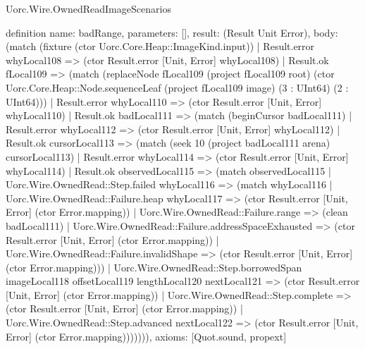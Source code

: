 \begin{lexlean}{Uorc.Wire.OwnedReadImageScenarios}
\begin{semanticmodule}
definition{
  name: badRange,
  parameters: [],
  result: (Result Unit Error),
  body: (match (fixture (ctor Uorc.Core.Heap::ImageKind.input))
    | Result.error whyLocal108 => (ctor Result.error [Unit, Error] whyLocal108)
    | Result.ok fLocal109 => (match (replaceNode fLocal109 (project fLocal109 root) (ctor Uorc.Core.Heap::Node.sequenceLeaf (project fLocal109 image) (3 : UInt64) (2 : UInt64)))
      | Result.error whyLocal110 => (ctor Result.error [Unit, Error] whyLocal110)
      | Result.ok badLocal111 => (match (beginCursor badLocal111)
        | Result.error whyLocal112 => (ctor Result.error [Unit, Error] whyLocal112)
        | Result.ok cursorLocal113 => (match (seek 10 (project badLocal111 arena) cursorLocal113)
          | Result.error whyLocal114 => (ctor Result.error [Unit, Error] whyLocal114)
          | Result.ok observedLocal115 => (match observedLocal115
            | Uorc.Wire.OwnedRead::Step.failed whyLocal116 => (match whyLocal116
              | Uorc.Wire.OwnedRead::Failure.heap whyLocal117 => (ctor Result.error [Unit, Error] (ctor Error.mapping))
              | Uorc.Wire.OwnedRead::Failure.range => (clean badLocal111)
              | Uorc.Wire.OwnedRead::Failure.addressSpaceExhausted => (ctor Result.error [Unit, Error] (ctor Error.mapping))
              | Uorc.Wire.OwnedRead::Failure.invalidShape => (ctor Result.error [Unit, Error] (ctor Error.mapping)))
            | Uorc.Wire.OwnedRead::Step.borrowedSpan imageLocal118 offsetLocal119 lengthLocal120 nextLocal121 => (ctor Result.error [Unit, Error] (ctor Error.mapping))
            | Uorc.Wire.OwnedRead::Step.complete => (ctor Result.error [Unit, Error] (ctor Error.mapping))
            | Uorc.Wire.OwnedRead::Step.advanced nextLocal122 => (ctor Result.error [Unit, Error] (ctor Error.mapping))))))),
  axioms: [Quot.sound, propext]
}


\end{semanticmodule}
\end{lexlean}
